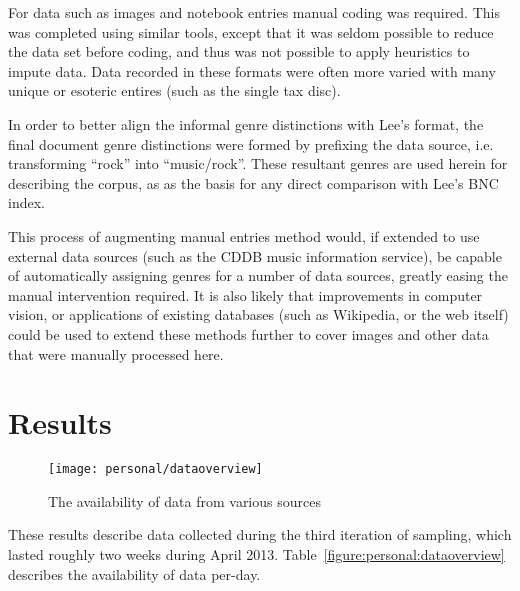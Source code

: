For data such as images and notebook entries manual coding was required.  This was completed using similar tools, except that it was seldom possible to reduce the data set before coding, and thus was not possible to apply heuristics to impute data.  Data recorded in these formats were often more varied with many unique or esoteric entires (such as the single tax disc).

In order to better align the informal genre distinctions with Lee's format, the final document genre distinctions were formed by prefixing the data source, i.e. transforming ``rock'' into ``music/rock''.  These resultant genres are used herein for describing the corpus, as as the basis for any direct comparison with Lee's BNC index.




This process of augmenting manual entries method would, if extended to use external data sources (such as the CDDB music information service), be capable of automatically assigning genres for a number of data sources, greatly easing the manual intervention required.  It is also likely that improvements in computer vision, or applications of existing databases (such as Wikipedia, or the web itself) could be used to extend these methods further to cover images and other data that were manually processed here.













\section{Results}

\begin{figure}[hp]
    \centering
    \texttt{[image: personal/dataoverview]}
    \caption{The availability of data from various sources}
    \label{fig:personal:dataoverview}
\end{figure}


These results describe data collected during the third iteration of sampling, which lasted roughly two weeks during April 2013.  Table~\ref{figure:personal:dataoverview} describes the availability of data per-day.

